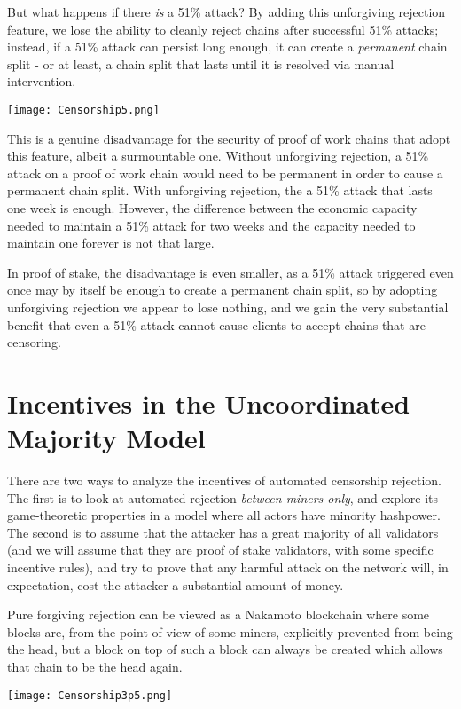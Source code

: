 \documentclass[12pt]{article}
\begin{document}
But what happens if there \textit{is} a 51\% attack? By adding this unforgiving rejection feature, we lose the ability to cleanly reject chains after successful 51\% attacks; instead, if a 51\% attack can persist long enough, it can create a \textit{permanent} chain split - or at least, a chain split that lasts until it is resolved via manual intervention.

\texttt{[image: Censorship5.png]}

This is a genuine disadvantage for the security of proof of work chains that adopt this feature, albeit a surmountable one. Without unforgiving rejection, a 51\% attack on a proof of work chain would need to be permanent in order to cause a permanent chain split. With unforgiving rejection, the a 51\% attack that lasts one week is enough. However, the difference between the economic capacity needed to maintain a 51\% attack for two weeks and the capacity needed to maintain one forever is not that large.

In proof of stake, the disadvantage is even smaller, as a 51\% attack triggered even once may by itself be enough to create a permanent chain split, so by adopting unforgiving rejection we appear to lose nothing, and we gain the very substantial benefit that even a 51\% attack cannot cause clients to accept chains that are censoring.

\section{Incentives in the Uncoordinated Majority Model}

There are two ways to analyze the incentives of automated censorship rejection. The first is to look at automated rejection \textit{between miners only}, and explore its game-theoretic properties in a model where all actors have minority hashpower. The second is to assume that the attacker has a great majority of all validators (and we will assume that they are proof of stake validators, with some specific incentive rules), and try to prove that any harmful attack on the network will, in expectation, cost the attacker a substantial amount of money.

Pure forgiving rejection can be viewed as a Nakamoto blockchain where some blocks are, from the point of view of some miners, explicitly prevented from being the head, but a block on top of such a block can always be created which allows that chain to be the head again.

\texttt{[image: Censorship3p5.png]}
\end{document}
